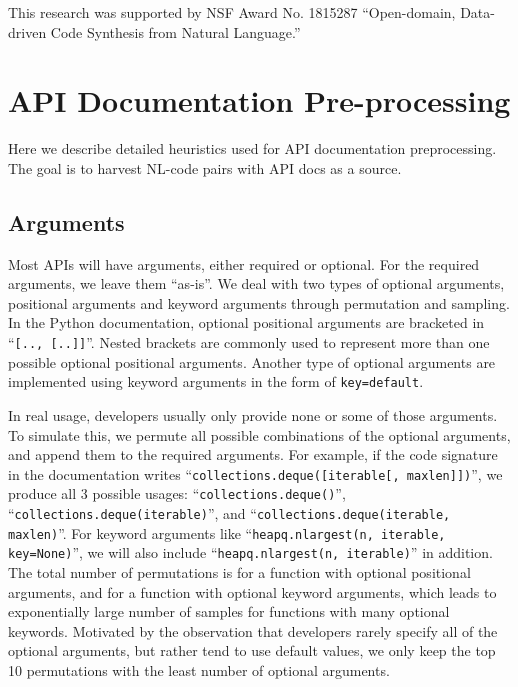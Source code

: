 \documentclass[11pt,a4paper]{article}
\begin{document}
This research was supported by NSF Award No. 1815287 ``Open-domain, Data-driven Code Synthesis from Natural Language.''




\newpage
\appendix

\section{API Documentation Pre-processing}
\label{app:apidocs}
Here we describe detailed heuristics used for API documentation preprocessing. 
The goal is to harvest NL-code pairs with API docs as a source.
\subsection{Arguments}
Most APIs will have arguments, either required or optional.
For the required arguments, we leave them ``as-is''.
We deal with two types of optional arguments, positional arguments and keyword arguments through permutation and sampling. 
In the Python documentation, optional positional arguments are bracketed in ``\texttt{[.., [..]]}''.
Nested brackets are commonly used to represent more than one possible optional positional arguments.
Another type of optional arguments are implemented using keyword arguments in the form of \texttt{key=default}.

In real usage, developers usually only provide none or some of those arguments.
To simulate this, we permute all possible combinations of the optional arguments, and append them to the required arguments.
For example, if the code signature in the documentation writes ``\texttt{collections.deque([iterable[, maxlen]])}'', we produce all 3 possible usages: ``\texttt{collections.deque()}'', ``\texttt{collections.deque(iterable)}'', and ``\texttt{collections.deque(iterable, maxlen)}''.
For keyword arguments like ``\texttt{heapq.nlargest(n, iterable, key=None)}'',
we will also include ``\texttt{heapq.nlargest(n, iterable)}'' in addition.
The total number of permutations is  for a function with  optional positional arguments, and  for a function with  optional keyword arguments, which leads to exponentially large number of samples for functions with many optional keywords.
Motivated by the observation that developers rarely specify all of the optional arguments, but rather tend to use default values, we only keep the top 10 permutations with the least number of optional arguments. 
\end{document}
